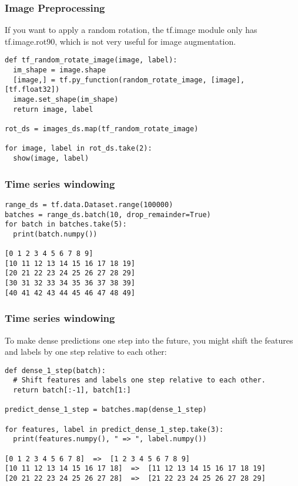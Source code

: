 \begin{frame}[fragile]\frametitle{Image Preprocessing}

If you want to apply a random rotation, the tf.image module only has tf.image.rot90, which is not very useful for image augmentation.

\begin{lstlisting}
def tf_random_rotate_image(image, label):
  im_shape = image.shape
  [image,] = tf.py_function(random_rotate_image, [image], [tf.float32])
  image.set_shape(im_shape)
  return image, label
	
rot_ds = images_ds.map(tf_random_rotate_image)

for image, label in rot_ds.take(2):
  show(image, label)
\end{lstlisting}
\end{frame}

\begin{frame}[fragile]\frametitle{Time series windowing}
\begin{lstlisting}
range_ds = tf.data.Dataset.range(100000)
batches = range_ds.batch(10, drop_remainder=True)
for batch in batches.take(5):
  print(batch.numpy())
	
[0 1 2 3 4 5 6 7 8 9]
[10 11 12 13 14 15 16 17 18 19]
[20 21 22 23 24 25 26 27 28 29]
[30 31 32 33 34 35 36 37 38 39]
[40 41 42 43 44 45 46 47 48 49]
\end{lstlisting}
\end{frame}

\begin{frame}[fragile]\frametitle{Time series windowing}

To make dense predictions one step into the future, you might shift the features and labels by one step relative to each other:

\begin{lstlisting}
def dense_1_step(batch):
  # Shift features and labels one step relative to each other.
  return batch[:-1], batch[1:]

predict_dense_1_step = batches.map(dense_1_step)

for features, label in predict_dense_1_step.take(3):
  print(features.numpy(), " => ", label.numpy())
	
[0 1 2 3 4 5 6 7 8]  =>  [1 2 3 4 5 6 7 8 9]
[10 11 12 13 14 15 16 17 18]  =>  [11 12 13 14 15 16 17 18 19]
[20 21 22 23 24 25 26 27 28]  =>  [21 22 23 24 25 26 27 28 29]
\end{lstlisting}
\end{frame}

